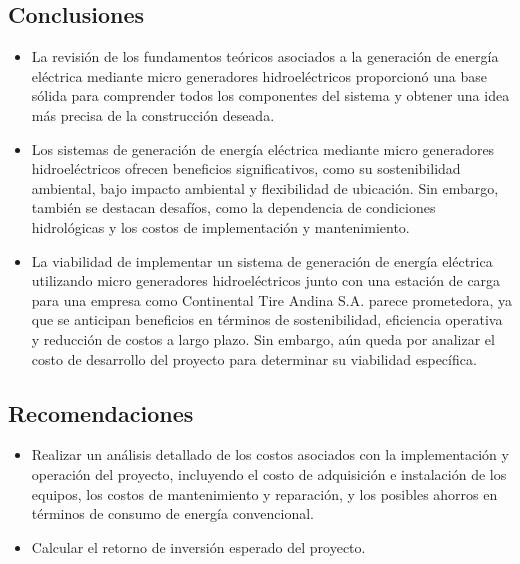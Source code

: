 \documentclass[11pt]{article}
\begin{document}
        \subsection{Conclusiones}
            \begin{itemize}
                \item La revisión de los fundamentos teóricos asociados a la generación de energía
                eléctrica mediante micro generadores hidroeléctricos proporcionó una base sólida
                para comprender todos los componentes del sistema y obtener una idea más precisa
                de la construcción deseada.
                
                \item Los sistemas de generación de energía eléctrica mediante micro generadores
                hidroeléctricos ofrecen beneficios significativos, como su sostenibilidad ambiental,
                bajo impacto ambiental y flexibilidad de ubicación. Sin embargo, también se
                destacan desafíos, como la dependencia de condiciones hidrológicas y los costos de
                implementación y mantenimiento.
                
                \item La viabilidad de implementar un sistema de generación de energía eléctrica
                utilizando micro generadores hidroeléctricos junto con una estación de carga para
                una empresa como Continental Tire Andina S.A. parece prometedora, ya que se
                anticipan beneficios en términos de sostenibilidad, eficiencia operativa y reducción
                de costos a largo plazo. Sin embargo, aún queda por analizar el costo de desarrollo
                del proyecto para determinar su viabilidad específica.
            \end{itemize}
  
        \subsection{Recomendaciones}
            \begin{itemize}
                \item Realizar un análisis detallado de los costos asociados con la implementación y
                operación del proyecto, incluyendo el costo de adquisición e instalación de los
                equipos, los costos de mantenimiento y reparación, y los posibles ahorros en
                términos de consumo de energía convencional.
                
                \item Calcular el retorno de inversión esperado del proyecto.
            \end{itemize}
     
\end{document}
